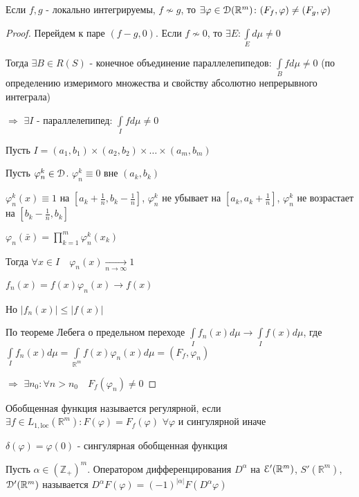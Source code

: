 \documentclass[a4paper,12pt]{report}
\begin{document}
\begin{prop}
Если $f,g$ - локально интегрируемы, $f\nsim g$, то $\exists\varphi\in\EuScript D(\mathbb R^m)\colon(F_f,\varphi)\ne(F_g,\varphi)$
\end{prop}
\begin{proof}
Перейдем к паре $(f-g,0)$. Если $f\nsim0$, то $\exists E\colon\displaystyle\int\limits_E d\mu\ne0$

Тогда $\exists B\in R(S)$ - конечное объединение параллелепипедов: $\displaystyle\int\limits_B fd\mu\ne0$ (по определению измеримого множества и свойству абсолютно непрерывного интеграла)

$\Rightarrow$ $\exists I$ - параллелепипед: $\displaystyle\int\limits_I fd\mu\ne0$

Пусть $I=(a_1,b_1)\times(a_2,b_2)\times\ldots\times(a_m,b_m)$

Пусть $\varphi_n^k\in\EuScript D$. $\varphi_n^k\equiv0$ вне $(a_k,b_k)$

$\varphi_n^k(x)\equiv1$ на $[a_k+\frac1n,b_k-\frac1n]$, $\varphi_n^k$ не убывает на $[a_k,a_k+\frac1n]$, $\varphi_n^k$ не возрастает на $[b_k-\frac1n,b_k]$

$\varphi_n(\bar x)=\prod\limits_{k=1}^m\varphi_n^k(x_k)$

Тогда $\forall x\in I\quad\varphi_n(x)\xrightarrow[n\to\infty]{}1$

$f_n(x)=f(x)\varphi_n(x)\to f(x)$

Но $|f_n(x)|\le|f(x)|$

По теореме Лебега о предельном переходе $\displaystyle\int\limits_I f_n(x)d\mu\to\displaystyle\int\limits_I f(x)d\mu$, где $\displaystyle\int\limits_I f_n(x)d\mu=\displaystyle\int\limits_{\mathbb R^m}f(x)\varphi_n(x)d\mu=(F_f,\varphi_n)$

$\Rightarrow$ $\exists n_0\colon\forall n>n_0\quad F_f(\varphi_n)\ne0$
\end{proof}


\begin{df}
Обобщенная функция называется регулярной, если \\$\exists f\in L_{1,\mathrm{loc}}(\mathbb R^m)\colon F(\varphi)=F_f(\varphi)$ $\forall\varphi$ и сингулярной иначе
\end{df}


\begin{ex}
$\delta(\varphi)=\varphi(0)$ - сингулярная обобщенная функция
\end{ex}


\begin{df}
Пусть $\alpha\in(\mathbb Z_+)^m$. Оператором дифференцирования $D^\alpha$ на $\EuScript E'(\mathbb R^m)$, $S'(\mathbb R^m)$, $\EuScript D'(\mathbb R^m)$ называется $D^\alpha F(\varphi)=(-1)^{|\alpha|}F(D^\alpha\varphi)$
\end{df}
\end{document}
